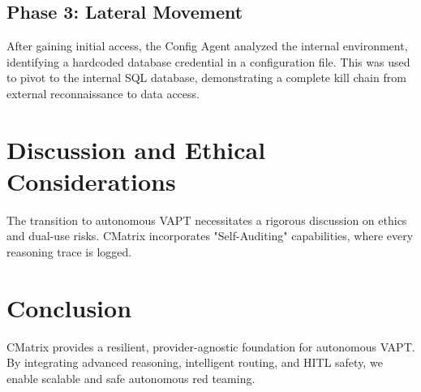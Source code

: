 \documentclass[conference,compsoc]{IEEEtran}
\begin{document}
\subsection{Phase 3: Lateral Movement}
After gaining initial access, the Config Agent analyzed the internal environment, identifying a hardcoded database credential in a configuration file. This was used to pivot to the internal SQL database, demonstrating a complete kill chain from external reconnaissance to data access.

\section{Discussion and Ethical Considerations}
The transition to autonomous VAPT necessitates a rigorous discussion on ethics and dual-use risks. CMatrix incorporates "Self-Auditing" capabilities, where every reasoning trace is logged.

\section{Conclusion}
CMatrix provides a resilient, provider-agnostic foundation for autonomous VAPT. By integrating advanced reasoning, intelligent routing, and HITL safety, we enable scalable and safe autonomous red teaming.



\end{document}
